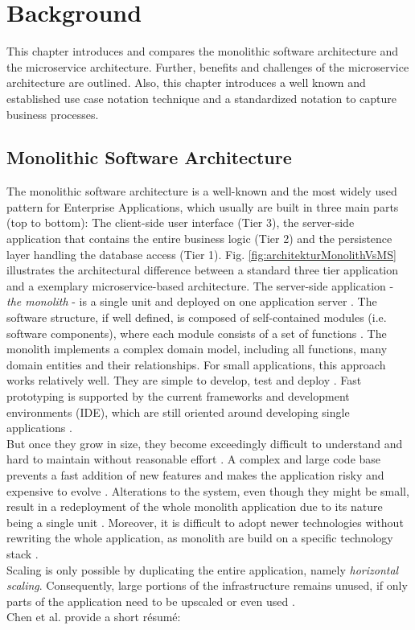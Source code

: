 \chapter{Background}
\label{ch:background}
This chapter introduces and compares the monolithic software architecture and the microservice architecture. Further, benefits and challenges of the microservice architecture are outlined. Also, this chapter introduces a well known and established use case notation technique and a standardized notation to capture business processes.



\section{Monolithic Software Architecture}
\label{sec:background:monolith}
The monolithic software architecture is a well-known and the most widely used pattern for Enterprise Applications, which usually are built in three main parts (top to bottom): The client-side user interface (Tier 3), the server-side application that contains the entire business logic (Tier 2) and the persistence layer handling the database access (Tier 1). Fig. \ref{fig:architekturMonolithVsMS} illustrates the architectural difference between a standard three tier application and a exemplary microservice-based architecture. The server-side application - \textit{the monolith} - is a single unit and deployed on one application server \cite{infoq}. The software structure, if well defined, is composed of self-contained modules (i.e. software components), where each module consists of a set of functions \cite{HeuristicsAlwis}.
The monolith implements a complex domain model, including all functions, many domain entities and their relationships.
For small applications, this approach works relatively well. They are simple to develop, test and deploy \cite{FunctionalDecompositionHeinrich}. Fast prototyping is supported by the current frameworks and development environments (IDE), which are still oriented around developing single applications \cite{infoq}.
\\
But once they grow in size, they become exceedingly difficult to understand and hard to maintain without reasonable effort \cite{FunctionalDecompositionHeinrich} \cite{ClassificationOfRefactoring}. A complex and large code base prevents a fast addition of new features and makes the application risky and expensive to evolve \cite{TowardsTechnique}.
Alterations to the system, even though they might be small, result in a redeployment of the whole monolith application due to its nature being a single unit \cite{FunctionalDecompositionHeinrich}. Moreover, it is difficult to adopt newer technologies without rewriting the whole application, as monolith are build on a specific technology stack \cite{infoq} \cite{ExtractionMazlami}.\\
Scaling is only possible by duplicating the entire application, namely \textit{horizontal scaling}. Consequently, large portions of the infrastructure remains unused, if only parts of the application need to be upscaled or even used \cite{EnticeApproach} \cite{MigratingTowardsSurvey}. \\
Chen et al. provide a short résumé:

